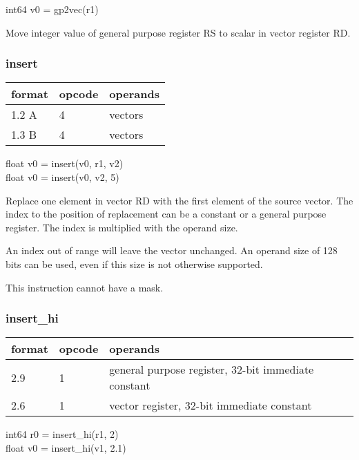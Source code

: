 \documentclass[forwardcom.tex]{subfiles}
\begin{document}
int64 v0 = gp2vec(r1)
\vspace{2mm}

Move integer value of general purpose register RS to
scalar in vector register RD.
\vspace{2mm}


\subsubsection{insert}
\label{table:insertInstruction}
\begin{tabular}{|p{12mm}|p{12mm}|p{110mm}|}
\hline
\bfseries format & \bfseries opcode & \bfseries operands \\ \hline
1.2 A & 4 & vectors \\
1.3 B & 4 & vectors \\ \hline
\end{tabular}
\vspace{2mm}

float v0 = insert(v0, r1, v2) \\
float v0 = insert(v0, v2, 5)
\vspace{2mm}

Replace one element in vector RD with the first element of the source vector. 
The index to the position of replacement can be a constant or a general purpose register. The index is multiplied with the operand size.
\vspace{2mm}

An index out of range will leave the vector unchanged. An operand size of 128 bits can be used, even if this size is not otherwise supported.
\vspace{2mm}

This instruction cannot have a mask.


\subsubsection{insert\_hi}
\label{table:insertHiInstruction}
\begin{tabular}{|p{12mm}|p{12mm}|p{110mm}|}
\hline
\bfseries format & \bfseries opcode & \bfseries operands \\ \hline
2.9 & 1 & general purpose register, 32-bit immediate constant \\ \hline
2.6 & 1 & vector register, 32-bit immediate constant \\ \hline
\end{tabular}
\vspace{2mm}

int64 r0 = insert\_hi(r1, 2) \\
float v0 = insert\_hi(v1, 2.1)
\vspace{2mm}
\end{document}

